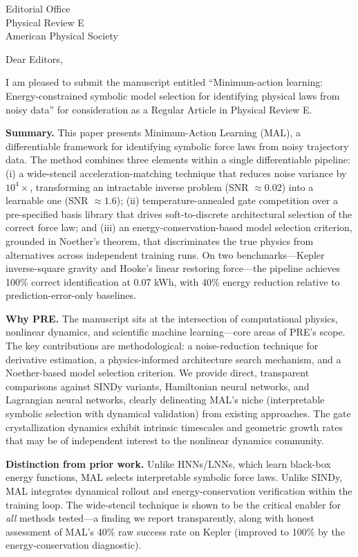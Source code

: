 \documentclass[12pt]{letter}
\begin{document}
\begin{letter}{Editorial Office\\Physical Review E\\American Physical Society}

\opening{Dear Editors,}

I am pleased to submit the manuscript entitled ``Minimum-action learning: Energy-constrained symbolic model selection for identifying physical laws from noisy data'' for consideration as a Regular Article in Physical Review E.

\textbf{Summary.} This paper presents Minimum-Action Learning (MAL), a differentiable framework for identifying symbolic force laws from noisy trajectory data. The method combines three elements within a single differentiable pipeline: (i) a wide-stencil acceleration-matching technique that reduces noise variance by $10^4\times$, transforming an intractable inverse problem (SNR $\approx 0.02$) into a learnable one (SNR $\approx 1.6$); (ii) temperature-annealed gate competition over a pre-specified basis library that drives soft-to-discrete architectural selection of the correct force law; and (iii) an energy-conservation-based model selection criterion, grounded in Noether's theorem, that discriminates the true physics from alternatives across independent training runs. On two benchmarks---Kepler inverse-square gravity and Hooke's linear restoring force---the pipeline achieves 100\% correct identification at 0.07 kWh, with 40\% energy reduction relative to prediction-error-only baselines.

\textbf{Why PRE.} The manuscript sits at the intersection of computational physics, nonlinear dynamics, and scientific machine learning---core areas of PRE's scope. The key contributions are methodological: a noise-reduction technique for derivative estimation, a physics-informed architecture search mechanism, and a Noether-based model selection criterion. We provide direct, transparent comparisons against SINDy variants, Hamiltonian neural networks, and Lagrangian neural networks, clearly delineating MAL's niche (interpretable symbolic selection with dynamical validation) from existing approaches. The gate crystallization dynamics exhibit intrinsic timescales and geometric growth rates that may be of independent interest to the nonlinear dynamics community.

\textbf{Distinction from prior work.} Unlike HNNs/LNNs, which learn black-box energy functions, MAL selects interpretable symbolic force laws. Unlike SINDy, MAL integrates dynamical rollout and energy-conservation verification within the training loop. The wide-stencil technique is shown to be the critical enabler for \emph{all} methods tested---a finding we report transparently, along with honest assessment of MAL's 40\% raw success rate on Kepler (improved to 100\% by the energy-conservation diagnostic).


\end{letter}
\end{document}

